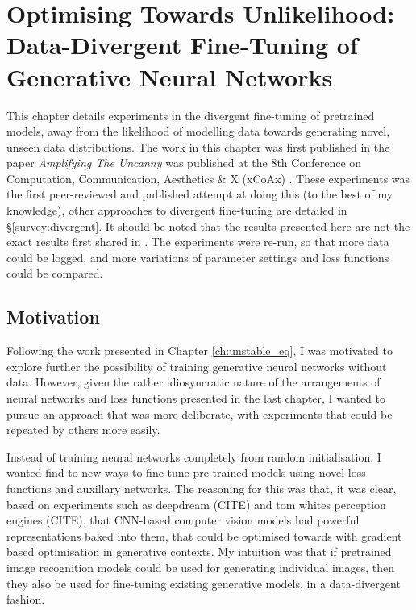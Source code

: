 \chapter{Optimising Towards Unlikelihood: Data-Divergent Fine-Tuning of Generative Neural Networks}
\label{ch:divergent}

This chapter details experiments in the divergent fine-tuning of pretrained models, away from the likelihood of modelling data towards generating novel, unseen data distributions. 
The work in this chapter was first published in the paper \textit{Amplifying The Uncanny} was published at the 8th Conference on Computation, Communication, Aesthetics \& X (xCoAx) \citep{broad2020amplifying}. 
These experiments was the first peer-reviewed and published attempt at doing this (to the best of my knowledge), other approaches to divergent fine-tuning are detailed in \S \ref{survey:divergent}. 
It should be noted that the results presented here are not the exact results first shared in \cite{broad2020amplifying}. The experiments were re-run, so that more data could be logged, and more variations of parameter settings and loss functions could be compared.

\section{Motivation}
\label{c4:sec:motivation}

Following the work presented in Chapter \ref{ch:unstable_eq}, I was motivated to explore further the possibility of training generative neural networks without data. 
However, given the rather idiosyncratic nature of the arrangements of neural networks and loss functions presented in the last chapter, I wanted to pursue an approach that was more deliberate, with experiments that could be repeated by others more easily. 

Instead of training neural networks completely from random initialisation, I wanted find to new ways to fine-tune pre-trained models using novel loss functions and auxillary networks. 
The reasoning for this was that, it was clear, based on experiments such as deepdream (CITE) and tom whites perception engines (CITE), that CNN-based computer vision models had powerful representations baked into them, that could be optimised towards with gradient based optimisation in generative contexts.
My intuition was that if pretrained image recognition models could be used for generating individual images, then they also be used for fine-tuning existing generative models, in a data-divergent fashion.

